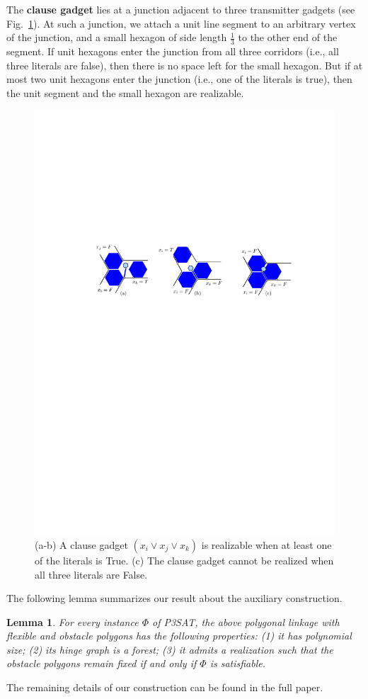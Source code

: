 \documentclass{article}
\theoremstyle{plain}%
\newtheorem{lemma}{Lemma}
\begin{document}
The {\bf clause gadget} lies at a junction adjacent to three transmitter gadgets (see Fig.~\ref{fig:clause}). At such a junction, we attach a unit line segment to an arbitrary vertex of the junction, and a small hexagon of side length $\frac{1}{3}$ to the other end of the segment. If unit hexagons enter the junction from all three corridors (i.e., all three literals are false), then there is no space left for the small hexagon. But if at most two unit hexagons enter the junction (i.e., one of the literals is true), then the unit segment and the small hexagon are realizable.

\begin{figure}[htbp]
	\centering
	\includegraphics[width=0.7\columnwidth]{fig-clause-hex}
	\caption{(a-b) A clause gadget $(x_i\vee x_j\vee x_k)$ is
    realizable when at least one of the literals is {\sc True}.
    (c) The clause gadget cannot be realized when all three literals are {\sc False}.}
	\label{fig:clause}
\end{figure}

The following lemma summarizes our result about the auxiliary construction.
\begin{lemma}\label{lem:aux}
For every instance $\Phi$ of P3SAT, the above polygonal linkage with flexible and obstacle polygons
has the following properties: (1) it has polynomial size; (2) its hinge graph is a forest;
(3) it admits a realization such that the obstacle polygons remain fixed if and only if $\Phi$ is satisfiable.
\end{lemma}
The remaining details of our construction can be found in the full paper.
\end{document}

